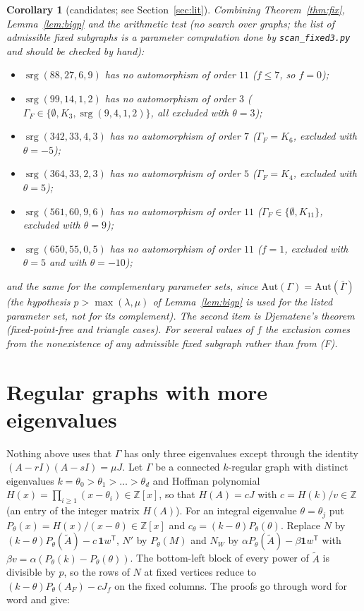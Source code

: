 \documentclass[11pt,a4paper]{article}
\newtheorem{corollary}[theorem]{Corollary}
\theoremstyle{remark}
\newcommand{\Z}{\mathbb{Z}}
\newcommand{\one}{\mathbf{1}}
\newcommand{\srg}{\operatorname{srg}}
\begin{document}
\begin{corollary}[candidates; see Section~\ref{sec:lit}]\label{cor:full}
Combining Theorem~\ref{thm:fix}, Lemma~\ref{lem:bigp} and the arithmetic test (no search over graphs; the list of admissible
fixed subgraphs is a parameter computation done by \texttt{scan\_fixed3.py} and should be checked by hand):
\begin{itemize}
\item $\srg(88,27,6,9)$ has no automorphism of order $11$ ($f\le7$, so $f=0$);
\item $\srg(99,14,1,2)$ has no automorphism of order $3$ ($\Gamma_F\in\{\emptyset,K_3,\srg(9,4,1,2)\}$, all excluded with $\theta=3$);
\item $\srg(342,33,4,3)$ has no automorphism of order $7$ ($\Gamma_F=K_6$, excluded with $\theta=-5$);
\item $\srg(364,33,2,3)$ has no automorphism of order $5$ ($\Gamma_F=K_4$, excluded with $\theta=5$);
\item $\srg(561,60,9,6)$ has no automorphism of order $11$ ($\Gamma_F\in\{\emptyset,K_{11}\}$, excluded with $\theta=9$);
\item $\srg(650,55,0,5)$ has no automorphism of order $11$ ($f=1$, excluded with $\theta=5$ and with $\theta=-10$);
\end{itemize}
and the same for the complementary parameter sets, since $\mathrm{Aut}(\Gamma)=\mathrm{Aut}(\bar\Gamma)$ (the hypothesis
$p>\max(\lambda,\mu)$ of Lemma~\ref{lem:bigp} is used for the listed parameter set, not for its complement). The second item is
Djematene's theorem (fixed-point-free and triangle cases). For several values of $f$ the exclusion comes from the nonexistence of
any admissible fixed subgraph rather than from (F).
\end{corollary}

\section{Regular graphs with more eigenvalues}\label{sec:gen}

Nothing above uses that $\Gamma$ has only three eigenvalues except through the identity $(A-rI)(A-sI)=\mu J$. Let $\Gamma$ be a
connected $k$-regular graph with distinct eigenvalues $k=\theta_0>\theta_1>\dots>\theta_d$ and Hoffman polynomial
$H(x)=\prod_{i\ge1}(x-\theta_i)\in\Z[x]$, so that $H(A)=cJ$ with $c=H(k)/v\in\Z$ (an entry of the integer matrix $H(A)$). For an
integral eigenvalue $\theta=\theta_j$ put $P_\theta(x)=H(x)/(x-\theta)\in\Z[x]$ and $c_\theta=(k-\theta)P_\theta(\theta)$. Replace
$N$ by $(k-\theta)P_\theta(\tilde A)-c\,\one w^{\mathsf T}$, $N'$ by $P_\theta(M)$ and $N_W$ by $\alpha P_\theta(\tilde A)-\beta\one w^{\mathsf T}$ with
$\beta v=\alpha(P_\theta(k)-P_\theta(\theta))$. The bottom-left block of every power of $\tilde A$ is divisible by $p$, so the rows of $N$
at fixed vertices reduce to $(k-\theta)P_\theta(A_F)-cJ_f$ on the fixed columns. The proofs go through word for word and give:
\end{document}
